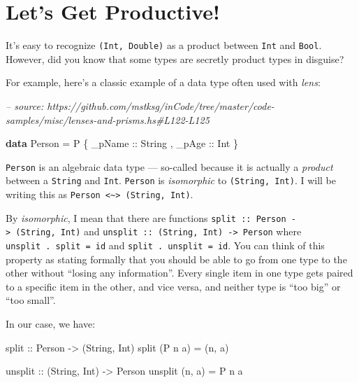 \documentclass[]{article}
\newenvironment{Shaded}{}{}
\newcommand{\CommentTok}[1]{\textcolor[rgb]{0.38,0.63,0.69}{\textit{#1}}}
\newcommand{\DataTypeTok}[1]{\textcolor[rgb]{0.56,0.13,0.00}{#1}}
\newcommand{\FunctionTok}[1]{\textcolor[rgb]{0.02,0.16,0.49}{#1}}
\newcommand{\KeywordTok}[1]{\textcolor[rgb]{0.00,0.44,0.13}{\textbf{#1}}}
\newcommand{\NormalTok}[1]{#1}
\newcommand{\OtherTok}[1]{\textcolor[rgb]{0.00,0.44,0.13}{#1}}
\begin{document}
\hypertarget{lets-get-productive}{%
\section{Let's Get Productive!}\label{lets-get-productive}}

It's easy to recognize \texttt{(Int,\ Double)} as a product between \texttt{Int}
and \texttt{Bool}. However, did you know that some types are secretly product
types in disguise?

For example, here's a classic example of a data type often used with
\emph{lens}:

\begin{Shaded}
\begin{Highlighting}[]
\CommentTok{-- source: https://github.com/mstksg/inCode/tree/master/code-samples/misc/lenses-and-prisms.hs#L122-L125}

\KeywordTok{data} \DataTypeTok{Person} \FunctionTok{=} \DataTypeTok{P}
\NormalTok{    \{}\OtherTok{ _pName ::} \DataTypeTok{String}
\NormalTok{    ,}\OtherTok{ _pAge  ::} \DataTypeTok{Int}
\NormalTok{    \}}
\end{Highlighting}
\end{Shaded}

\texttt{Person} is an algebraic data type --- so-called because it is actually a
\emph{product} between a \texttt{String} and \texttt{Int}. \texttt{Person} is
\emph{isomorphic} to \texttt{(String,\ Int)}. I will be writing this as
\texttt{Person\ \textless{}\textasciitilde{}\textgreater{}\ (String,\ Int)}.

By \emph{isomorphic}, I mean that there are functions
\texttt{split\ ::\ Person\ -\textgreater{}\ (String,\ Int)} and
\texttt{unsplit\ ::\ (String,\ Int)\ -\textgreater{}\ Person} where
\texttt{unsplit\ .\ split\ =\ id} and \texttt{split\ .\ unsplit\ =\ id}. You can
think of this property as stating formally that you should be able to go from
one type to the other without ``losing any information''. Every single item in
one type gets paired to a specific item in the other, and vice versa, and
neither type is ``too big'' or ``too small''.

In our case, we have:

\begin{Shaded}
\begin{Highlighting}[]
\OtherTok{split ::} \DataTypeTok{Person} \OtherTok{->}\NormalTok{ (}\DataTypeTok{String}\NormalTok{, }\DataTypeTok{Int}\NormalTok{)}
\NormalTok{split (}\DataTypeTok{P}\NormalTok{ n a) }\FunctionTok{=}\NormalTok{ (n, a)}

\OtherTok{unsplit ::}\NormalTok{ (}\DataTypeTok{String}\NormalTok{, }\DataTypeTok{Int}\NormalTok{) }\OtherTok{->} \DataTypeTok{Person}
\NormalTok{unsplit (n, a) }\FunctionTok{=} \DataTypeTok{P}\NormalTok{ n a}
\end{Highlighting}
\end{Shaded}
\end{document}
